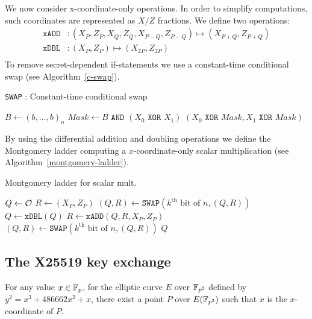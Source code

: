We now consider x-coordinate-only operations. In order to simplify computations,
such coordinates are represented as $X/Z$ fractions. We define two operations:
\begin{align*}
\texttt{xADD} &: (X_P, Z_P, X_Q , Z_Q, X_{P-Q}, Z_{P-Q}) \mapsto (X_{P+Q}, Z_{P+Q})\\
\texttt{xDBL} &: (X_P, Z_P) \mapsto (X_{2P}, Z_{2P})\\
\end{align*}
To remove secret-dependent if-statements we use a constant-time conditional swap
(see Algorithm~\ref{c-swap}).
\begin{algorithm}
\caption{\texttt{SWAP} : Constant-time conditional swap}
\label{c-swap}
\begin{algorithmic}
\STATE $B \leftarrow (b, \ldots, b)_n$
\STATE $Mask \leftarrow B \texttt{ AND } (X_0\texttt{ XOR } X_1)$
\RETURN $(X_0 \texttt{ XOR } Mask, X_1 \texttt{ XOR } Mask)$
\end{algorithmic}
\end{algorithm}

By using the differential addition and doubling operations we define the Montgomery ladder
computing a $x$-coordinate-only scalar multiplication (see Algorithm~\ref{montgomery-ladder}).
\begin{algorithm}
\caption{Montgomery ladder for scalar mult.}
\label{montgomery-ladder}
\begin{algorithmic}
\STATE $Q \leftarrow \mathcal{O}$
\STATE $R \leftarrow (X_P,Z_P)$
  \STATE $(Q,R) \leftarrow \texttt{SWAP}(k^{\text{th}}\text{ bit of }n, (Q,R))$
  \STATE $Q \leftarrow \texttt{xDBL}(Q)$
  \STATE $R \leftarrow \texttt{xADD}(Q,R,X_P,Z_P)$
  \STATE $(Q,R) \leftarrow \texttt{SWAP}(k^{\text{th}}\text{ bit of }n, (Q,R))$
\ENDFOR
\RETURN $Q$
\end{algorithmic}
\end{algorithm}

\subsection{The X25519 key exchange}
\label{preliminaries:A}

For any value $x \in \mathbb{F}_{p}$, for the elliptic curve $E$ over $\mathbb{F}_{p^2}$
defined by $y^2 = x^3 + 486662 x^2 + x$, there exist a point $P$ over $E(\mathbb{F}_{p^2})$
such that $x$ is the $x$-coordinate of $P$.

